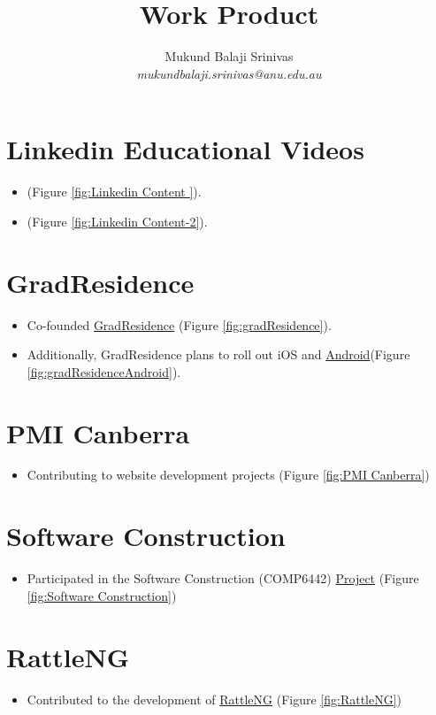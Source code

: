 \documentclass{article}
\title{Work Product}
\author{Mukund Balaji Srinivas\\\textit{mukundbalaji.srinivas@anu.edu.au}}
\begin{document}
\maketitle

\section*{Linkedin Educational Videos}
\begin{itemize}
    \item  (Figure \ref{fig:Linkedin Content }).
    \item (Figure \ref{fig:Linkedin Content-2}).
\end{itemize}


\section*{GradResidence}
\begin{itemize}
    \item Co-founded \href{https://gradresidence.com/}{GradResidence} (Figure \ref{fig:gradResidence}).
    \item Additionally, GradResidence plans to roll out iOS and \href{https://github.com/gradresidence/android}{Android}(Figure \ref{fig:gradResidenceAndroid}).
\end{itemize}

\section*{PMI Canberra}
\begin{itemize}
    \item Contributing to website development projects (Figure \ref{fig:PMI Canberra})
\end{itemize}

\section*{Software Construction}
\begin{itemize}
    \item Participated in the Software Construction (COMP6442) \href{https://gitlab.cecs.anu.edu.au/u7544253/ga-23s1-comp2100-6442} {Project} (Figure \ref{fig:Software Construction})
\end{itemize}

\section*{RattleNG}
\begin{itemize}
    \item Contributed to the development of \href{https://github.com/gjwgit/rattleng}{RattleNG} (Figure \ref{fig:RattleNG})
\end{itemize}
\end{document}

